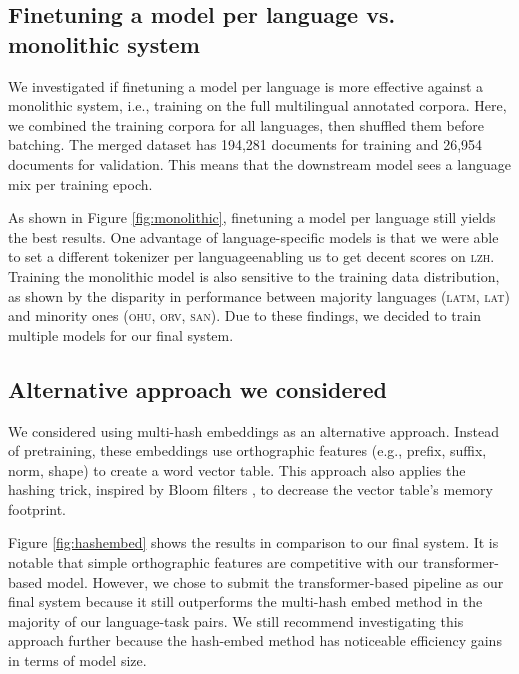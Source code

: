\documentclass[11pt]{article}
\begin{document}
\subsection{Finetuning a model per language vs. monolithic system}

We investigated if finetuning a model per language is more effective against a monolithic system, i.e., training on the full multilingual annotated corpora.
Here, we combined the training corpora for all languages, then shuffled them before batching.
The merged dataset has 194,281 documents for training and 26,954 documents for validation.
This means that the downstream model sees a language mix per training epoch.

As shown in Figure \ref{fig:monolithic}, finetuning a model per language still yields the best results.
One advantage of language-specific models is that we were able to set a different tokenizer per language\textemdash enabling us to get decent scores on \textsc{lzh}.
Training the monolithic model is also sensitive to the training data distribution, as shown by the disparity in performance between majority languages (\textsc{latm}, \textsc{lat}) and minority ones (\textsc{ohu}, \textsc{orv}, \textsc{san}).
Due to these findings, we decided to train multiple models for our final system.

\subsection{Alternative approach we considered}


We considered using multi-hash embeddings \cite{miranda-etal-2022-multi} as an alternative approach.
Instead of pretraining, these embeddings use orthographic features (e.g., prefix, suffix, norm, shape) to create a word vector table.
This approach also applies the hashing trick, inspired by Bloom filters \cite{bloom-1970-space}, to decrease the vector table's memory footprint.

Figure \ref{fig:hashembed} shows the results in comparison to our final system.
It is notable that simple orthographic features are competitive with our transformer-based model.
However, we chose to submit the transformer-based pipeline as our final system because it still outperforms the multi-hash embed method in the majority of our language-task pairs. 
We still recommend investigating this approach further because the hash-embed method has noticeable efficiency gains in terms of model size.
\end{document}
